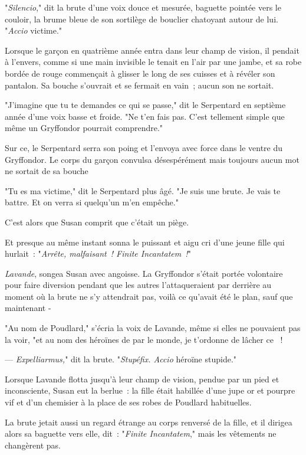 "\emph{Silencio}," dit la brute d'une voix douce et mesurée, baguette pointée vers le couloir, la brume bleue de son sortilège de bouclier chatoyant autour de lui. "\emph{Accio} victime."

Lorsque le garçon en quatrième année entra dans leur champ de vision, il pendait à l'envers, comme si une main invisible le tenait en l'air par une jambe, et sa robe bordée de rouge commençait à glisser le long de ses cuisses et à révéler son pantalon. Sa bouche s'ouvrait et se fermait en vain~; aucun son ne sortait.

"J'imagine que tu te demandes ce qui se passe," dit le Serpentard en septième année d'une voix basse et froide. "Ne t'en fais pas. C'est tellement simple que même un Gryffondor pourrait comprendre."

Sur ce, le Serpentard serra son poing et l'envoya avec force dans le ventre du Gryffondor. Le corps du garçon convulsa désespérément mais toujours aucun mot ne sortait de sa bouche

"Tu es ma victime," dit le Serpentard plus âgé. "Je suis une brute. Je vais te battre. Et on verra si quelqu'un m'en empêche."

C'est alors que Susan comprit que c'était un piège.

Et presque au même instant sonna le puissant et aigu cri d'une jeune fille qui hurlait~: "\emph{Arrête, malfaisant~! Finite Incantatem~!}"

\emph{Lavande}, songea Susan avec angoisse. La Gryffondor s'était portée volontaire pour faire diversion pendant que les autres l'attaqueraient par derrière au moment où la brute ne s'y attendrait pas, voilà ce qu'avait été le plan, sauf que maintenant -

"Au nom de Poudlard," s'écria la voix de Lavande, même si elles ne pouvaient pas la voir, "et au nom des héroïnes de par le monde, je t'ordonne de lâcher ce ~!

--- \emph{Expelliarmus,}" dit la brute. "\emph{Stupéfix. Accio} héroïne stupide."

Lorsque Lavande flotta jusqu'à leur champ de vision, pendue par un pied et inconsciente, Susan eut la berlue~: la fille était habillée d'une jupe or et pourpre vif et d'un chemisier à la place de ses robes de Poudlard habituelles.

La brute jetait aussi un regard étrange au corps renversé de la fille, et il dirigea alors sa baguette vers elle, dit~: "\emph{Finite Incantatem}," mais les vêtements ne changèrent pas.

